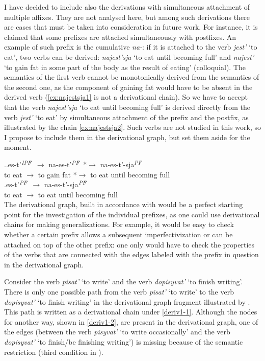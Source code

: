 I have decided to include also the derivations with simultaneous attachment of multiple affixes. They are not analysed here, but among such derivations there are cases that must be taken into consideration in future work. For instance, it is claimed that some prefixes are attached simultaneously with postfixes. An example of such prefix is the cumulative \textit{na-}: if it is attached to the verb \textit{jest'} `to eat', two verbs can be derived: \textit{najest'sja} `to eat until becoming full' and \textit{najest'} `to gain fat in some part of the body as the result of eating' (colloquial). The semantics of the first verb cannot be  monotonically derived from the semantics of the second one, as the component of gaining fat would have to be absent in the derived verb (\ref{ex:najestsja1} is not a derivational chain). So we have to accept that the verb \textit{najest'sja} `to eat until becoming full' is derived directly from the verb \textit{jest'} `to eat' by simultaneous attachment of the prefix and the postfix, as illustrated by the chain \ref{ex:najestsja2}. Such verbs are not studied in this work, so I propose to include them in the derivational graph, but set them aside for the moment.
 
 \ex.\label{ex:najestsja}\ag.\label{ex:najestsja1}es-t'$^{\mathit{IPF}}$ $\rightarrow$ na-es-t'$^{\mathit{PF}}$ *$\rightarrow$ na-es-t'-sja$^{\mathit{PF}}$\\	
{to eat} $\rightarrow$ {to gain fat} *$\rightarrow$ {to eat until becoming full}\\
\bg.\label{ex:najestsja2}es-t'$^{\mathit{PF}}$ $\rightarrow$ na-es-t'-sja$^{\mathit{PF}}$\\
{to eat} $\rightarrow$ {to eat until becoming full}\\

The derivational graph, built in accordance with  would be a perfect starting point for the investigation of the individual prefixes, as one could use derivational chains for making generalizations. For example, it would be easy to check whether a certain prefix allows a subsequent imperfectivization or can be attached on top of the other prefix: one only would have to check the properties of the verbs that are connected with the edges labeled with the prefix in question in the derivational graph. 

Consider the verb \textit{pisat'} `to write' and the verb \textit{dopisyvat'} `to finish writing'. There is only one possible path from the verb \textit{pisat'} `to write' to the verb \textit{dopisyvat'} `to finish writing' in the derivational graph fragment illustrated by . This path is written as a derivational chain under \ref{deriv1-1}. Although the nodes for another way, shown in \ref{deriv1-2}, are present in the derivational graph, one of the edges (between the verb \textit{pisyvat'} `to write occasionally' and the verb \textit{dopisyvat'} `to finish/be finishing writing') is missing because of the semantic restriction (third condition in ).

